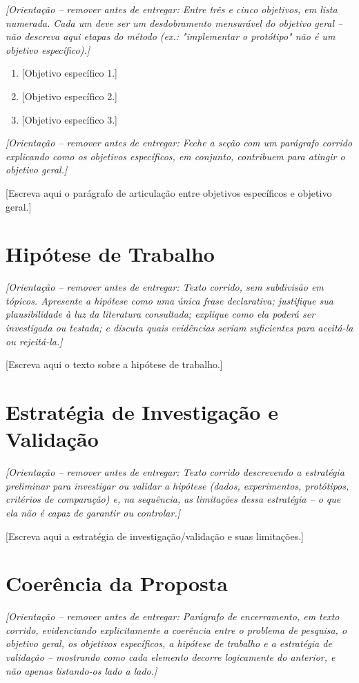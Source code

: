 \documentclass[10pt,a4paper]{extarticle}
\newcommand{\ntc}[1]{\textcolor{notice}{#1}}
\newcommand{\guia}[1]{{\small\ntc{\textit{[Orientação -- remover antes de entregar: #1]}}}}
\begin{document}
\guia{Entre três e cinco objetivos, em lista numerada. Cada um deve ser um desdobramento
mensurável do objetivo geral -- não descreva aqui etapas do método (ex.: "implementar o
protótipo" não é um objetivo específico).}

\begin{enumerate}[label=\textbf{OE\arabic*.}]
    \item{} [Objetivo específico 1.]
    \item{} [Objetivo específico 2.]
    \item{} [Objetivo específico 3.]
\end{enumerate}

\guia{Feche a seção com um parágrafo corrido explicando como os objetivos específicos,
em conjunto, contribuem para atingir o objetivo geral.}

[Escreva aqui o parágrafo de articulação entre objetivos específicos e objetivo geral.]

\section{Hipótese de Trabalho}

\guia{Texto corrido, sem subdivisão em tópicos. Apresente a hipótese como uma única frase
declarativa; justifique sua plausibilidade à luz da literatura consultada; explique como ela
poderá ser investigada ou testada; e discuta quais evidências seriam suficientes para
aceitá-la ou rejeitá-la.}

[Escreva aqui o texto sobre a hipótese de trabalho.]

\section{Estratégia de Investigação e Validação}

\guia{Texto corrido descrevendo a estratégia preliminar para investigar ou validar a
hipótese (dados, experimentos, protótipos, critérios de comparação) e, na sequência, as
limitações dessa estratégia -- o que ela não é capaz de garantir ou controlar.}

[Escreva aqui a estratégia de investigação/validação e suas limitações.]

\section{Coerência da Proposta}

\guia{Parágrafo de encerramento, em texto corrido, evidenciando explicitamente a coerência
entre o problema de pesquisa, o objetivo geral, os objetivos específicos, a hipótese de
trabalho e a estratégia de validação -- mostrando como cada elemento decorre logicamente do
anterior, e não apenas listando-os lado a lado.}
\end{document}
